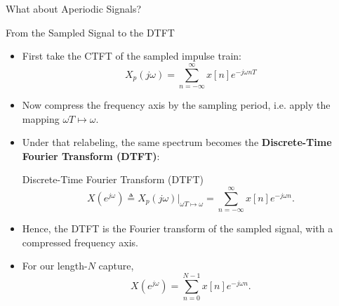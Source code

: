\begin{frame}{What about Aperiodic Signals?}
\begin{center}
  \end{center}
\end{frame}

\begin{frame}{From the Sampled Signal to the DTFT}

  \begin{itemize}
      \setlength{\itemsep}{0.2em}
    \item   First take the CTFT of the sampled impulse train:
      \vspace{0.05cm}
      \begin{equation*}
        X_p(j\omega)=\sum_{n=-\infty}^{\infty} x[n]e^{-j\omega nT}
      \end{equation*}
    \item Now compress the frequency axis by the sampling period, i.e. apply the mapping $\omega T \mapsto \omega$.
    \item Under that relabeling, the same spectrum becomes the \textbf{Discrete-Time Fourier Transform (DTFT)}:
      \begin{conceptbox}{Discrete-Time Fourier Transform (DTFT)}
        \begin{equation*}
          X(e^{j\omega}) \triangleq X_p(j\omega)\big|_{\omega T \mapsto \omega}
          = \sum_{n=-\infty}^{\infty} x[n]e^{-j\omega n}.
        \end{equation*}
      \end{conceptbox}
    \item Hence, the DTFT is the Fourier transform of the sampled signal, with a compressed frequency axis.
    \item For our length-$N$ capture,
      \begin{equation*}
        X(e^{j\omega})=\sum_{n=0}^{N-1} x[n]e^{-j\omega n}.
      \end{equation*}
  \end{itemize}
\end{frame}

